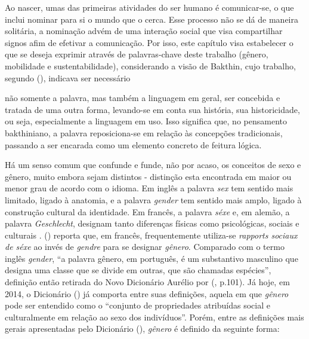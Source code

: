 Ao nascer, umas das primeiras atividades do ser humano é comunicar-se, o que inclui nominar para si o mundo que o cerca. Esse processo não se dá de maneira solitária, a nominação advém de uma interação social que visa compartilhar signos afim de efetivar a comunicação. Por isso, este capítulo visa estabelecer o que se deseja exprimir através de palavras-chave deste trabalho (gênero, mobilidade e sustentabilidade), considerando a visão de Bakthin, cujo trabalho, segundo  (\citeyear{STELLA2005}), indicava ser necessário

\begin{citacao}
não somente a palavra, mas também a linguagem em geral, ser concebida e tratada de uma outra forma, levando-se em conta sua história, sua historicidade, ou seja, especialmente a linguagem em uso. Isso significa que, no pensamento bakthiniano, a palavra reposiciona-se em relação às concepções tradicionais, passando a ser encarada como um elemento concreto de feitura lógica.
\end{citacao}

Há um senso comum que confunde e funde, não por acaso, os conceitos de sexo e gênero, muito embora sejam distintos - distinção esta encontrada em maior ou menor grau de acordo com o idioma. Em inglês a palavra \emph{sex} tem sentido mais limitado, ligado à anatomia, e a palavra \emph{gender} tem sentido mais amplo, ligado à construção cultural da identidade. Em francês, a palavra \emph{séxe} e, em alemão, a palavra \emph{Geschlecht}, designam tanto diferenças físicas como psicológicas, sociais e culturais \cite{FRAISSE2001}.  (\citeyear{MORAES1998}) reporta que, em francês, frequentemente utiliza-se \emph{rapports sociaux de séxe} ao invés de \emph{gendre} para se designar \emph{gênero}. Comparado com o termo inglês \emph{gender}, ``a palavra gênero, em português, é um substantivo masculino que designa uma classe que se divide em outras, que são chamadas espécies'', definição então retirada do Novo Dicionário Aurélio por  (\citeyear{MORAES1998}, p.101).
Já hoje, em 2014, o Dicionário  (\citeyear{AURELIOONLINE})
já comporta entre suas definições, aquela em que \emph{gênero} pode ser entendido como o ``conjunto de propriedades atribuídas social e culturalmente em relação ao sexo dos indivíduos''.
Porém, entre as definições mais gerais apresentadas pelo Dicionário  (\citeyear{MICHAELISONLINE}), \emph{gênero} é definido da seguinte forma:


